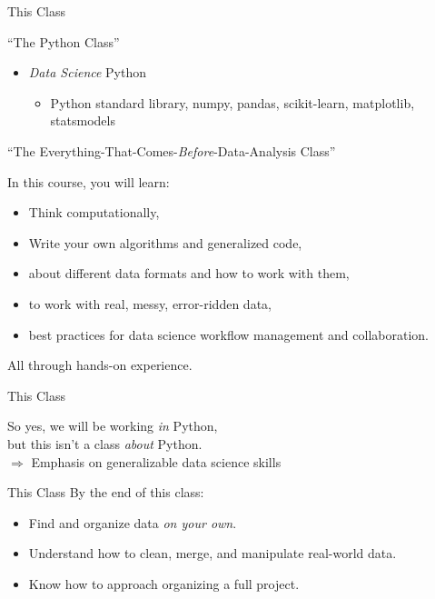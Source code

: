 \documentclass[11pt]{beamer}
\begin{document}
\begin{frame}[c]{This Class}

``The Python Class'' \\

\begin{itemize}
	\pause \item \emph{Data Science} Python
	\begin{itemize}
		\pause \item Python standard library, numpy, pandas, scikit-learn, matplotlib, statsmodels
	\end{itemize}
\end{itemize}
\end{frame}

\begin{frame}[c]{``The Everything-That-Comes-\emph{Before}-Data-Analysis Class''}

\pause In this course, you will learn:
\begin{itemize}
	\pause \item Think computationally,
	\pause \item Write your own algorithms and generalized code,
	\pause \item about different data formats and how to work with them,
	\pause \item to work with real, messy, error-ridden data,
	\pause \item best practices for data science workflow management and collaboration.
\end{itemize}
\pause \alert{All} through hands-on experience.
\end{frame}

\begin{frame}[c]{This Class}

	So yes, we will be working \emph{in} Python, \\ 
\pause but this isn't a class \emph{about} Python. \\
\pause $\Rightarrow$ Emphasis on generalizable data science skills

\end{frame}

\begin{frame}[c]{This Class}
By the end of this class:
\begin{itemize}
	\pause \item Find and organize data \emph{on your own}.
	\pause \item Understand how to clean, merge, and manipulate real-world data.
	\pause \item Know how to approach organizing a full project.
\end{itemize}
\end{frame}
\end{document}
